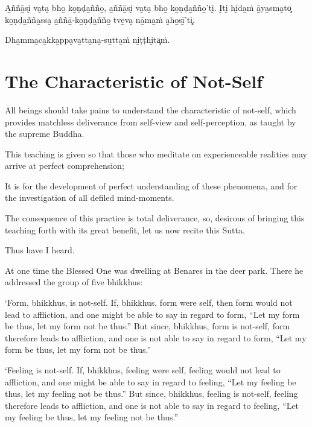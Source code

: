 A̱ññā̱si̮ va̮ta̮ bho̱ ko̱ṇḍa̱ñño̱, a̱ññā̱si̮ va̮ta̮ bho̱ ko̱ṇḍa̱ñño̱'ti̮. I̮ti̮ hi̮da̱ṁ ā̱ya̱sma̮to͓
ko̱ṇḍa̱ñña̱ssa̮ a̱ññā̱-ko̱ṇḍa̱ñño̱ tve̱va̮ nā̱ma̱ṁ a̮ho̱sī̱'ti͓.

Dha̱mma̮ca̱kka̱ppa̮va̱tta̮na̮-su̱tta̱ṁ ni̱ṭṭhi̮ta͓ṁ.

\chapterTocDelegatePageNumber
\chapter{The Characteristic of Not-Self}

\setTocDelegatedPageNumber
\englishText
\renewcommand{\englishTitle}{The Characteristic of Not-Self}

\begin{leader}

All beings should take pains to understand the characteristic of
not-self, which provides matchless deliverance from self-view and
self-perception, as taught by the supreme Buddha.

This teaching is given so that those who meditate on experienceable
realities may arrive at perfect comprehension;

It is for the development of perfect understanding of these phenomena,
and for the investigation of all defiled mind-moments.

The consequence of this practice is total deliverance, so, desirous of
bringing this teaching forth with its great benefit, let us now recite
this Sutta.

\end{leader}

Thus have I heard.

At one time the Blessed One was dwelling at Benares in the deer park.
There he addressed the group of five bhikkhus:

‘Form, bhikkhus, is not-self. If, bhikkhus, form were self, then form
would not lead to affliction, and one might be able to say in regard to
form, “Let my form be thus, let my form not be thus.” But since,
bhikkhus, form is not-self, form therefore leads to affliction, and one
is not able to say in regard to form, “Let my form be thus, let my form
not be thus.”

‘Feeling is not-self. If, bhikkhus, feeling were self, feeling would
not lead to affliction, and one might be able to say in regard to
feeling, “Let my feeling be thus, let my feeling not be thus.” But
since, bhikkhus, feeling is not-self, feeling therefore leads to
affliction, and one is not able to say in regard to feeling, “Let my
feeling be thus, let my feeling not be thus.”

